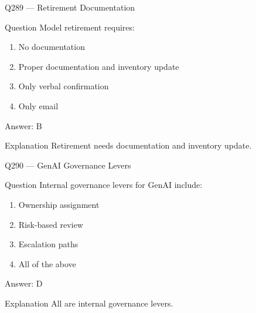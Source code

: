 \documentclass[aspectratio=169,8pt]{beamer}
\begin{document}
										\begin{frame}{Q289 --- Retirement Documentation}
											\begin{block}{Question}
												Model retirement requires:
												\begin{enumerate}
													\item No documentation
													\item Proper documentation and inventory update
													\item Only verbal confirmation
													\item Only email
												\end{enumerate}
											\end{block}
											\begin{exampleblock}{Answer: B}\end{exampleblock}
											\begin{block}{Explanation}
												Retirement needs documentation and inventory update.
											\end{block}
										\end{frame}
										
										\begin{frame}{Q290 --- GenAI Governance Levers}
											\begin{block}{Question}
												Internal governance levers for GenAI include:
												\begin{enumerate}
													\item Ownership assignment
													\item Risk-based review
													\item Escalation paths
													\item All of the above
												\end{enumerate}
											\end{block}
											\begin{exampleblock}{Answer: D}\end{exampleblock}
											\begin{block}{Explanation}
												All are internal governance levers.
											\end{block}
										\end{frame}
										
\end{document}
